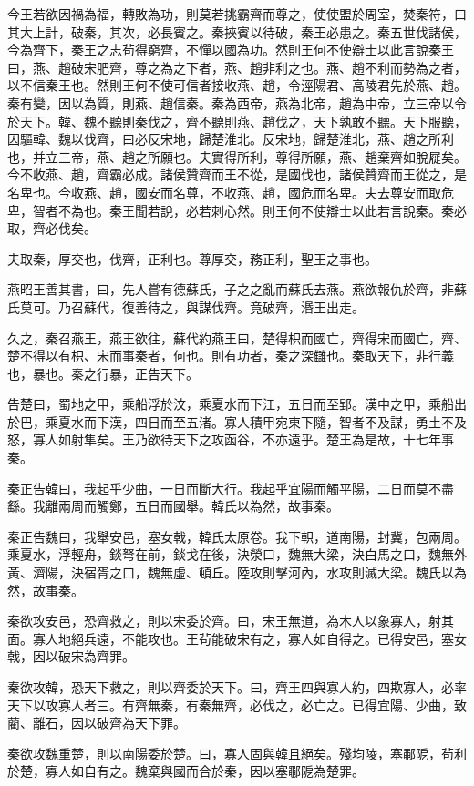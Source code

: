 今王若欲因禍為福，轉敗為功，則莫若挑霸齊而尊之，使使盟於周室，焚秦符，曰其大上計，破秦，其次，必長賓之。秦挾賓以待破，秦王必患之。秦五世伐諸侯，今為齊下，秦王之志茍得窮齊，不憚以國為功。然則王何不使辯士以此言說秦王曰，燕、趙破宋肥齊，尊之為之下者，燕、趙非利之也。燕、趙不利而勢為之者，以不信秦王也。然則王何不使可信者接收燕、趙，令涇陽君、高陵君先於燕、趙。秦有變，因以為質，則燕、趙信秦。秦為西帝，燕為北帝，趙為中帝，立三帝以令於天下。韓、魏不聽則秦伐之，齊不聽則燕、趙伐之，天下孰敢不聽。天下服聽，因驅韓、魏以伐齊，曰必反宋地，歸楚淮北。反宋地，歸楚淮北，燕、趙之所利也，并立三帝，燕、趙之所願也。夫實得所利，尊得所願，燕、趙棄齊如脫屣矣。今不收燕、趙，齊霸必成。諸侯贊齊而王不從，是國伐也，諸侯贊齊而王從之，是名卑也。今收燕、趙，國安而名尊，不收燕、趙，國危而名卑。夫去尊安而取危卑，智者不為也。秦王聞若說，必若刺心然。則王何不使辯士以此若言說秦。秦必取，齊必伐矣。

夫取秦，厚交也，伐齊，正利也。尊厚交，務正利，聖王之事也。

燕昭王善其書，曰，先人嘗有德蘇氏，子之之亂而蘇氏去燕。燕欲報仇於齊，非蘇氏莫可。乃召蘇代，復善待之，與謀伐齊。竟破齊，湣王出走。

久之，秦召燕王，燕王欲往，蘇代約燕王曰，楚得枳而國亡，齊得宋而國亡，齊、楚不得以有枳、宋而事秦者，何也。則有功者，秦之深讎也。秦取天下，非行義也，暴也。秦之行暴，正告天下。

告楚曰，蜀地之甲，乘船浮於汶，乘夏水而下江，五日而至郢。漢中之甲，乘船出於巴，乘夏水而下漢，四日而至五渚。寡人積甲宛東下隨，智者不及謀，勇土不及怒，寡人如射隼矣。王乃欲待天下之攻函谷，不亦遠乎。楚王為是故，十七年事秦。

秦正告韓曰，我起乎少曲，一日而斷大行。我起乎宜陽而觸平陽，二日而莫不盡繇。我離兩周而觸鄭，五日而國舉。韓氏以為然，故事秦。

秦正告魏曰，我舉安邑，塞女戟，韓氏太原卷。我下軹，道南陽，封冀，包兩周。乘夏水，浮輕舟，錟弩在前，錟戈在後，決滎口，魏無大梁，決白馬之口，魏無外黃、濟陽，決宿胥之口，魏無虛、頓丘。陸攻則擊河內，水攻則滅大梁。魏氏以為然，故事秦。

秦欲攻安邑，恐齊救之，則以宋委於齊。曰，宋王無道，為木人以象寡人，射其面。寡人地絕兵遠，不能攻也。王茍能破宋有之，寡人如自得之。已得安邑，塞女戟，因以破宋為齊罪。

秦欲攻韓，恐天下救之，則以齊委於天下。曰，齊王四與寡人約，四欺寡人，必率天下以攻寡人者三。有齊無秦，有秦無齊，必伐之，必亡之。已得宜陽、少曲，致藺、離石，因以破齊為天下罪。

秦欲攻魏重楚，則以南陽委於楚。曰，寡人固與韓且絕矣。殘均陵，塞鄳阸，茍利於楚，寡人如自有之。魏棄與國而合於秦，因以塞鄳阸為楚罪。

